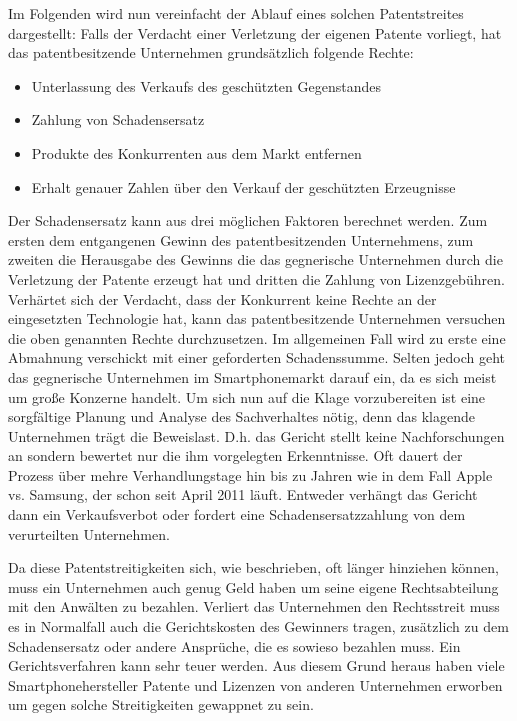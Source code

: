 Im Folgenden wird nun vereinfacht der Ablauf eines solchen Patentstreites dargestellt: Falls der Verdacht einer Verletzung der eigenen Patente vorliegt,  hat das patentbesitzende  Unternehmen grundsätzlich folgende Rechte:
\begin{itemize}
\item  Unterlassung des Verkaufs des geschützten Gegenstandes
\item  Zahlung von Schadensersatz
\item  Produkte des Konkurrenten aus dem Markt entfernen
\item  Erhalt genauer Zahlen über den Verkauf der geschützten Erzeugnisse
\end{itemize}

Der Schadensersatz kann aus drei möglichen Faktoren berechnet werden. Zum ersten dem entgangenen Gewinn des patentbesitzenden Unternehmens, zum zweiten die Herausgabe des Gewinns die das gegnerische Unternehmen durch die Verletzung der Patente erzeugt hat und dritten die Zahlung von Lizenzgebühren. Verhärtet sich der Verdacht, dass der Konkurrent keine Rechte an der eingesetzten Technologie hat, kann das patentbesitzende Unternehmen versuchen die oben genannten Rechte durchzusetzen. Im allgemeinen Fall wird zu erste eine Abmahnung verschickt mit einer geforderten  Schadenssumme. Selten jedoch geht das gegnerische Unternehmen im Smartphonemarkt darauf ein, da es sich meist um große Konzerne handelt. Um sich nun auf die Klage vorzubereiten ist eine sorgfältige Planung und Analyse des Sachverhaltes nötig, denn das klagende Unternehmen trägt die Beweislast. D.h. das Gericht stellt keine Nachforschungen an sondern bewertet nur die ihm vorgelegten Erkenntnisse. Oft dauert der Prozess über mehre Verhandlungstage hin bis zu Jahren wie in dem Fall  Apple vs. Samsung,  der schon seit April 2011 läuft. Entweder verhängt das Gericht dann ein Verkaufsverbot oder fordert eine Schadensersatzzahlung von dem verurteilten Unternehmen.

Da diese Patentstreitigkeiten sich, wie beschrieben, oft länger hinziehen können, muss ein Unternehmen auch genug Geld haben um seine eigene Rechtsabteilung mit den Anwälten zu bezahlen. Verliert das Unternehmen den Rechtsstreit muss es in Normalfall auch die Gerichtskosten des Gewinners tragen, zusätzlich zu dem Schadensersatz oder andere Ansprüche, die es sowieso bezahlen muss. Ein Gerichtsverfahren kann sehr teuer werden. Aus diesem Grund heraus haben viele Smartphonehersteller Patente und Lizenzen von anderen Unternehmen erworben um gegen solche Streitigkeiten gewappnet zu sein.

